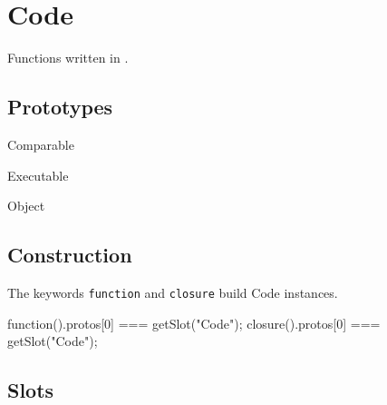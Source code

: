 \section{Code}

Functions written in \us.

\subsection{Prototypes}

\begin{refObjects}
\item[Comparable]
\item[Executable]
\item[Object]
\end{refObjects}

\subsection{Construction}

The keywords \lstinline|function| and \lstinline|closure| build Code
instances.

\begin{urbiassert}
function(){}.protos[0] === getSlot("Code");
closure(){}.protos[0] === getSlot("Code");
\end{urbiassert}

\subsection{Slots}

